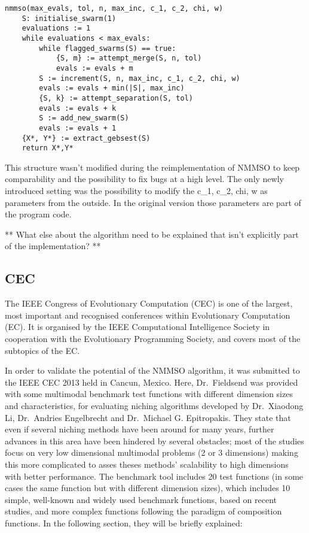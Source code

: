 \documentclass[12pt,a4paper]{article}
\begin{document}
\begin{verbatim}
nmmso(max_evals, tol, n, max_inc, c_1, c_2, chi, w)
    S: initialise_swarm(1)
    evaluations := 1
    while evaluations < max_evals:
        while flagged_swarms(S) == true:
            {S, m} := attempt_merge(S, n, tol)
            evals := evals + m
        S := increment(S, n, max_inc, c_1, c_2, chi, w)
        evals := evals + min(|S|, max_inc)
        {S, k} := attempt_separation(S, tol)
        evals := evals + k
        S := add_new_swarm(S)
        evals := evals + 1
    {X*, Y*} := extract_gebsest(S)
    return X*,Y*
\end{verbatim}

This structure wasn't modified during the reimplementation of NMMSO to
keep comparability and the possibility to fix bugs at a high level. The
only newly introduced setting was the possibility to modify the c\_1,
c\_2, chi, w as parameters from the outside. In the original version
those parameters are part of the program code.

** What else about the algorithm need to be explained that isn't
explicitly part of the implementation? **

\subsection{CEC}\label{cec}

The IEEE Congress of Evolutionary Computation (CEC) is one of the
largest, most important and recognised conferences within Evolutionary
Computation (EC). It is organised by the IEEE Computational Intelligence
Society in cooperation with the Evolutionary Programming Society, and
covers most of the subtopics of the EC.

In order to validate the potential of the NMMSO algorithm, it was
submitted to the IEEE CEC 2013 held in Cancun, Mexico. Here,
Dr.~Fieldsend was provided with some multimodal benchmark test functions
with different dimension sizes and characteristics, for evaluating
niching algorithms developed by Dr.~Xiaodong Li, Dr.~Andries Engelbrecht
and Dr.~Michael G. Epitropakis. They state that even if several niching
methods have been around for many years, further advances in this area
have been hindered by several obstacles; most of the studies focus on
very low dimensional multimodal problems (2 or 3 dimensions) making this
more complicated to asses theses methods' scalability to high dimensions
with better performance. The benchmark tool includes 20 test functions
(in some cases the same function but with different dimension sizes),
which includes 10 simple, well-known and widely used benchmark
functions, based on recent studies, and more complex functions following
the paradigm of composition functions. In the following section, they
will be briefly explained:
\end{document}
